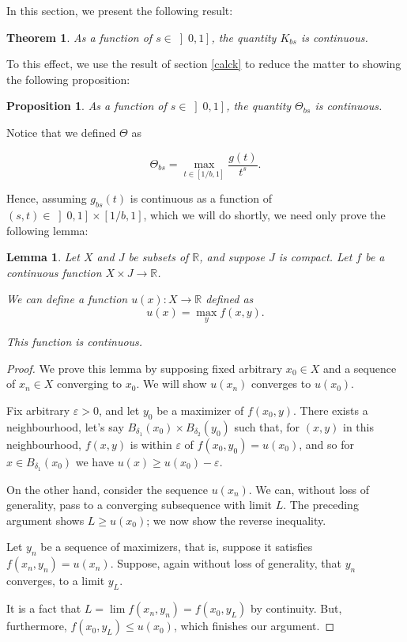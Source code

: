 \documentclass[11pt, reqno]{amsart}
\newcommand{\R}{\mathbb{R}}
\newtheorem{lemma}{Lemma}
\newtheorem{theorem}{Theorem}
\newtheorem{prop}{Proposition}
\begin{document}
In this section, we present the following result:

\begin{theorem}
As a function of $s \in \left]0, 1\right]$, the quantity $K_{bs}$ is continuous.
\end{theorem}

To this effect, we use the result of section \ref{calck} to reduce the matter to showing the following proposition:

\begin{prop}
As a function of $s \in \left]0, 1\right]$, the quantity $\Theta_{bs}$ is continuous.
\end{prop}

Notice that we defined $\Theta$ as

\[ \Theta_{bs} = \max_{t \in \left[ 1/b, 1 \right]} \frac{g(t)}{t^s}.\]

Hence, assuming $g_{bs}(t)$ is continuous as a function of $(s, t) \in \left]0, 1\right] \times \left[1/b, 1\right]$, which we will do shortly, we need only prove the following lemma:

\begin{lemma}
Let $X$ and $J$ be subsets of $\R$, and suppose $J$ is compact. Let $f$ be a continuous function $X \times J \to \R$.

We can define a function $u(x) : X \to \R$ defined as
\[ u(x) = \max_y f(x,y).\]

This function is continuous.
\end{lemma}

\begin{proof}
We prove this lemma by supposing fixed arbitrary $x_0 \in X$ and a sequence of $x_n \in X$ converging to $x_0$. We will show $u(x_n)$ converges to $u(x_0)$.

Fix arbitrary $\varepsilon > 0$, and let $y_0$ be a maximizer of $f(x_0, y)$. There exists a neighbourhood, let's say $B_{\delta_1}(x_0) \times B_{\delta_2}(y_0)$ such that, for $(x,y)$ in this neighbourhood, $f(x,y)$ is within $\varepsilon$ of $f(x_0, y_0) = u(x_0)$, and so for $x \in B_{\delta_1}(x_0)$ we have $u(x) \geq u(x_0) - \varepsilon$.

On the other hand, consider the sequence $u(x_n)$. We can, without loss of generality, pass to a converging subsequence with limit $L$. The preceding argument shows $L \geq u(x_0)$; we now show the reverse inequality.

Let $y_n$ be a sequence of maximizers, that is, suppose it satisfies $f(x_n, y_n) = u(x_n)$. Suppose, again without loss of generality, that $y_n$ converges, to a limit $y_L$.

It is a fact that $L = \lim f(x_n, y_n) = f(x_0, y_L)$ by continuity. But, furthermore, $f(x_0, y_L) \leq u(x_0)$, which finishes our argument.
\end{proof}
\end{document}
